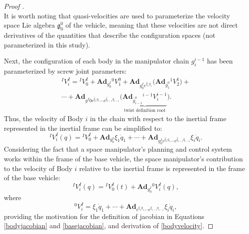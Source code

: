 \documentclass[lettersize,journal]{IEEEtran}
\def \g  {\mathfrak{g}}
\def \Ad {\textbf{Ad}}
\begin{document}
\begin{proof}[Proof ]
\begin{equation}
\end{equation}
It is worth noting that quasi-velocities are used to parameterize the velocity space Lie algebra $\g^0_0$ of the vehicle, meaning that these velocities are not direct derivatives of the quantities that describe the configuration spaces (not parameterized in this study). 

Next, the configuration of each body in the manipulator chain $g^{i-1}_i$ has been parameterized by screw joint parameters:
\begin{multline} {}^IV^I_i={}^IV_0^I+\Ad_{g^I_0}{}^0V_{1}^{0}+\Ad_{g^I_0e^{\hat{\xi}_1q_1}}\big(\Ad_{\bar{g}^0_1}{}^1V_{2}^{1}\big)+\\
    \cdots+\Ad_{g^I0e^{\hat{\xi}_1q_1}\cdots e^{\hat{\xi}_{i-1}q_{i-1}}}\big(\underbrace{\Ad_{\bar{g}^0_{i-1}}{}^{i-1}V_{i}^{i-1}}_\text{twist definition root}\big).
\end{multline}
Thus, the velocity of Body $i$ in the chain with respect to the inertial frame represented in the inertial frame can be simplified to:
\begin{equation}
    {}^IV_i^I(q)={}^IV_0^ I+\Ad_{g^{I}_0}{}\xi_1\dot{q}_1+\cdots+\Ad_{g^{I}_0e^{\hat{\xi}_{1}q_{1}}\cdots e^{\hat{\xi}_{i-1}q_{i-1}}}\xi_i\dot{q}_i.
\end{equation}
Considering the fact that a space manipulator's planning and control system works within the frame of the base vehicle, the space manipulator's contribution to the velocity of Body $i$ relative to the inertial frame is represented in the frame of the base vehicle:
\begin{equation}
    ^IV_i^{I    }(q)={}^IV^I_0(t)+\Ad_{g^I_0}{}^0V^I_i(q),
\end{equation}
where
\begin{equation}
    ^0V^I_i=\xi_1\dot{q}_1+\cdots+\Ad_{e^{\xi_{1}q_{1}}\cdots e^{\xi_{i-1}q_{i-1}}}\xi_i\dot{q}_i,
\end{equation}
providing the motivation for the definition of jacobian in Equations \ref{bodyjacobian} and \ref{basejacobian}, and derivation of \eqref{bodyvelocity}.
\end{proof}
\end{document}
